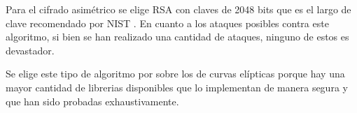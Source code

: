 Para el cifrado asimétrico se elige RSA con claves de 2048 bits que es el largo 
de clave recomendado por NIST \cite{NIST-RSA}. En cuanto a los ataques posibles 
contra este algoritmo, si bien se han realizado una cantidad de ataques, 
ninguno de estos es devastador.

Se elige este tipo de algoritmo por sobre los de curvas elípticas porque hay  
una mayor cantidad de librerias disponibles que lo implementan de manera segura 
y que han sido probadas exhaustivamente.
